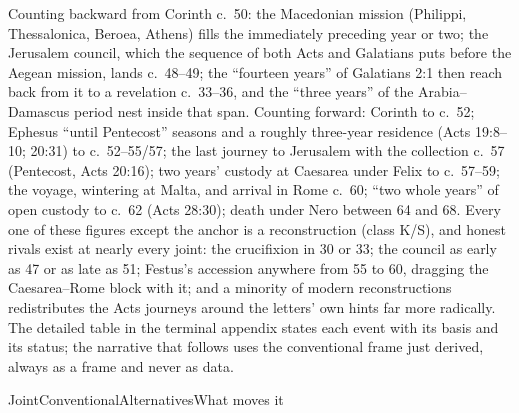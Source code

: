 Counting backward from Corinth c.~50: the Macedonian mission (Philippi,
Thessalonica, Beroea, Athens) fills the immediately preceding year or
two; the Jerusalem council, which the sequence of both Acts and Galatians
puts before the Aegean mission, lands c.~48--49; the ``fourteen years''
of Galatians 2:1 then reach back from it to a revelation c.~33--36, and
the ``three years'' of the Arabia--Damascus period nest inside that span.
Counting forward: Corinth to c.~52; Ephesus ``until Pentecost'' seasons
and a roughly three-year residence (Acts 19:8--10; 20:31) to c.~52--55/57;
the last journey to Jerusalem with the collection c.~57 (Pentecost, Acts
20:16); two years' custody at Caesarea under Felix to c.~57--59; the
voyage, wintering at Malta, and arrival in Rome c.~60; ``two whole years''
of open custody to c.~62 (Acts 28:30); death under Nero between 64 and
68. Every one of these figures except the anchor is a reconstruction
(class K/S), and honest rivals exist at nearly every joint: the
crucifixion in 30 or 33; the council as early as 47 or as late as 51;
Festus's accession anywhere from 55 to 60, dragging the Caesarea--Rome
block with it; and a minority of modern reconstructions redistributes the
Acts journeys around the letters' own hints far more radically. The
detailed table in the terminal appendix states each event with its basis
and its status; the narrative that follows uses the conventional frame
just derived, always as a frame and never as data.

\begin{fourstable}{Joint}{Conventional}{Alternatives}{What moves it}
\end{fourstable}

